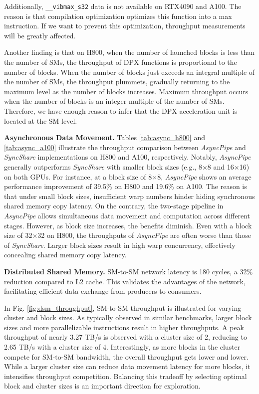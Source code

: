 Additionally, \texttt{\_\_vibmax\_s32} data is not available on RTX4090 and A100. The reason is that compilation optimization optimizes this function into a max instruction. If we want to prevent this optimization, throughput measurements will be greatly affected. 

Another finding is that on H800, when the number of launched blocks is less than the number of SMs, the throughput of DPX functions is proportional to the number of blocks. When the number of blocks just exceeds an integral multiple of the number of SMs, the throughput plummets, gradually returning to the maximum level as the number of blocks increases. Maximum throughput occurs when the number of blocks is an integer multiple of the number of SMs. Therefore, we have enough reason to infer that the DPX acceleration unit is located at the SM level.

 \textbf{Asynchronous Data Movement.} Tables \ref{tab:async_h800} and \ref{tab:async_a100} illustrate the throughput comparison between \textsl{AsyncPipe} and \textsl{SyncShare} implementations on H800 and A100, respectively. Notably, \textsl{AsyncPipe} generally outperforms \textsl{SyncShare} with smaller block sizes (e.g., 8$\times$8 and 16$\times$16) on both GPUs. For instance, at a block size of 8$\times$8, \textsl{AsyncPipe} shows an average performance improvement of 39.5\% on H800 and 19.6\% on A100. The reason is that under small block sizes, insufficient warp numbers hinder hiding synchronous shared memory copy latency. On the contrary, the two-stage pipeline in \textsl{AsyncPipe} allows simultaneous data movement and computation across different stages. However, as block size increases, the benefits diminish. Even with a block size of 32$\times$32 on H800, the throughputs of \textsl{AsyncPipe} are often worse than those of \textsl{SyncShare}. Larger block sizes result in high warp concurrency, effectively concealing shared memory copy latency.

 \textbf{Distributed Shared Memory.} SM-to-SM network latency is 180 cycles, a 32\% reduction compared to L2 cache. This validates the advantages of the network, facilitating efficient data exchange from producers to consumers.

In Fig. \ref{fig:dsm_throughput}, SM-to-SM throughput is illustrated for varying cluster and block sizes. As typically observed in similar benchmarks, larger block sizes and more parallelizable instructions result in higher throughputs. A peak throughput of nearly 3.27 TB/s is observed with a cluster size of 2, reducing to 2.65 TB/s with a cluster size of 4. Interestingly, as more blocks in the cluster compete for SM-to-SM bandwidth, the overall throughput gets lower and lower. While a larger cluster size can reduce data movement latency for more blocks, it intensifies throughput competition. Balancing this tradeoff by selecting optimal block and cluster sizes is an important direction for exploration.

